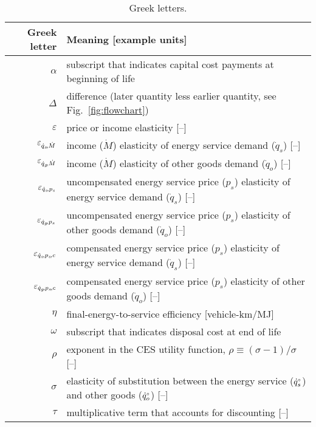 
\begin{table}
\footnotesize
\centering %
\caption{Greek letters.}
\begin{tabular}{r l}
  \toprule
  Greek letter & Meaning [example units] \\
  \midrule
  $\alpha$       & subscript that indicates capital cost payments at beginning of life \\
  $\Delta$       & difference (later quantity less earlier quantity, see Fig.~\ref{fig:flowchart}) \\
  $\varepsilon$  & price or income elasticity [--] \\
  $\varepsilon_{\dot{q}_s\!,\dot{M}}$        & income ($\dot{M}$) elasticity of energy service demand ($\dot{q}_s$) [--] \\
  $\varepsilon_{\dot{q}_g\!,\dot{M}}$        & income ($\dot{M}$) elasticity of other goods demand ($\dot{q}_o$) [--] \\
  $\varepsilon_{\dot{q}_s\!,p_s}$     & uncompensated energy service price ($p_s$) elasticity of energy service demand ($\dot{q}_s$) [--] \\
  $\varepsilon_{\dot{q}_g\!,p_s}$     & uncompensated energy service price ($p_s$) elasticity of other goods demand ($\dot{q}_o$) [--] \\
  $\varepsilon_{\dot{q}_s\!,p_s\!,c}$      & compensated energy service price ($p_s$) elasticity of energy service demand ($\dot{q}_s$) [--] \\
  $\varepsilon_{\dot{q}_g\!,p_s\!,c}$      & compensated energy service price ($p_s$) elasticity of other goods demand ($\dot{q}_o$) [--] \\
  $\eta$         & final-energy-to-service efficiency [vehicle-km/MJ] \\
  $\omega$       & subscript that indicates disposal cost at end of life \\
  $\rho$         & exponent in the CES utility function, $\rho \equiv (\sigma - 1) / \sigma$ [--] \\
  $\sigma$       & elasticity of substitution between the energy service (${}{\dot{q}}^{\scriptscriptstyle \circ}_s$) and other goods (${}{\dot{q}}^{\scriptscriptstyle \circ}_o$) [--] \\
  $\tau$         & multiplicative term that accounts for discounting [--] \\
  \bottomrule
\end{tabular}
\label{tab:greek}
\end{table}



